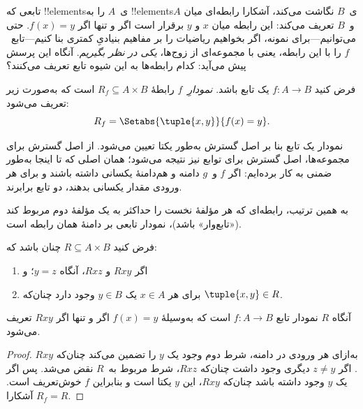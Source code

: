 \documentclass[../../../include/open-logic-section]{subfiles}
\begin{document}


\begin{explain}
تابعی که !!{element}sی~$A$ را به !!{element}sی~$B$
نگاشت می‌کند، آشکارا رابطه‌ای میان $A$ و~$B$ تعریف می‌کند:
این رابطه میان $x$ و $y$ برقرار است اگر و تنها اگر $f(x) = y$.
حتی می‌توانیم---برای نمونه، اگر بخواهیم ریاضیات را بر مفاهیم بنیادیِ
کمتری بنا کنیم---تابع~$f$ را با این رابطه، یعنی با مجموعه‌ای از
زوج‌ها، \emph{یکی در نظر بگیریم}. آنگاه این پرسش پیش می‌آید:
کدام رابطه‌ها به این شیوه تابع تعریف می‌کنند؟
\end{explain}

\begin{defn} فرض کنید $f\colon A \to B$ یک تابع باشد.
\emph{نمودارِ}~$f$ رابطهٔ $R_f \subseteq A \times B$ است که
به‌صورت زیر تعریف می‌شود:
\[
R_f = \Setabs{\tuple{x,y}}{f(x) = y}.
\]
\end{defn}

\begin{explain}
نمودار یک تابع بنا بر اصل گسترش به‌طور یکتا تعیین می‌شود.
از اصل گسترش برای مجموعه‌ها، اصل گسترش برای توابع نیز نتیجه می‌شود؛
همان اصلی که تا اینجا به‌طور ضمنی به کار برده‌ایم:
اگر $f$ و~$g$ دامنه و هم‌دامنهٔ یکسانی داشته باشند و برای هر
ورودی مقدار یکسانی بدهند، دو تابع برابرند.

به همین ترتیب، رابطه‌ای که هر مؤلفهٔ نخست را حداکثر به یک مؤلفهٔ دوم مربوط کند («تابع‌وار» باشد)، نمودار تابعی بر دامنهٔ همان رابطه است.
\end{explain}

\begin{prop}
فرض کنید $R \subseteq A \times B$ چنان باشد که:
\begin{enumerate}
\item اگر $Rxy$ و $Rxz$، آنگاه $y = z$؛ و
\item برای هر $x \in A$ یک $y \in B$ وجود دارد چنان‌که $\tuple{x,
y} \in R$.
\end{enumerate}
آنگاه $R$ نمودار تابع $f\colon A \to B$ است که به‌وسیلهٔ
$f(x) = y$ اگر و تنها اگر $Rxy$ تعریف می‌شود.
\end{prop}

\begin{proof}
به‌ازای هر ورودی در دامنه، شرط دوم وجود یک $y$ را تضمین می‌کند چنان‌که $Rxy$. اگر $z \neq
y$ دیگری وجود داشت چنان‌که $Rxz$، شرط مربوط به~$R$ نقض می‌شد. پس اگر
یک $y$ وجود داشته باشد چنان‌که $Rxy$، این $y$ یکتا است و بنابراین $f$
خوش‌تعریف است. آشکارا $R_f = R$.
\end{proof}
\end{document}
